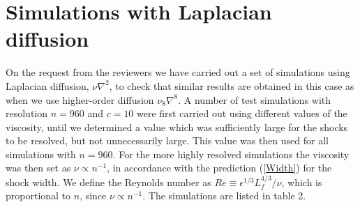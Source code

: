 \appendix

\section{Simulations with Laplacian diffusion}
On the request from the reviewers we have carried out a set of simulations using Laplacian diffusion, $ \nu \nabla^{2} $, to check that similar results are obtained in this case as when we use higher-order diffusion $ \nu_8 \nabla^{8} $.
A number of test simulations with resolution $ n = 960 $ and $ c= 10 $ were
first carried out using different values of the viscosity, until we determined a value which was sufficiently large for the shocks to be resolved, but not unnecessarily large.
This value was then used for all simulations with $ n = 960 $. For the more
highly resolved simulations the viscosity was then set as $ \nu \propto n^{-1} $, in accordance with the prediction  (\ref{Width}) for the shock width.
We define the Reynolds number as $ Re \equiv \epsilon^{1/3} L_f^{4/3}/\nu $, which is proportional to $ n $, since $ \nu \propto n^{-1} $.
The simulations are listed in table 2.






